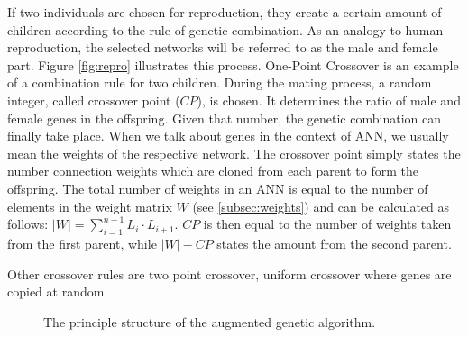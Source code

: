\documentclass[10pt,a4paper,DIV=11]{scrreprt}
\begin{document}
If two individuals are chosen for reproduction, they create a certain amount of children according to the rule of genetic combination. 
As an analogy to human reproduction, the selected networks will be referred to as the male and female part. Figure \ref{fig:repro} illustrates this process. One-Point Crossover is an example of a combination rule for two children.
During the mating process, a random integer, called crossover point ($CP$), is chosen. It determines the ratio of male and female genes in the offspring. Given that number, the genetic combination can finally take place.
When we talk about genes in the context of ANN, we usually mean the weights of the respective network. The crossover point simply states the number connection weights which are cloned from each parent to form the offspring.
The total number of weights in an ANN is equal to the number of elements in the weight matrix $W$ (see \ref{subsec:weights}) and can be calculated as follows: $|W| = \sum^{n-1}_{i=1} L_i \cdot L_{i+1}$.
$CP$ is then equal to the number of weights taken from the first parent, while $|W|-CP$ states the amount from the second parent. 

Other crossover rules are two point crossover, uniform crossover where genes are copied at random %

\begin{figure}
	\centering
    \caption{The principle structure of the augmented genetic algorithm.\cite{CROSSOVER}}
	\label{fig:ag}
\end{figure}
\end{document}
